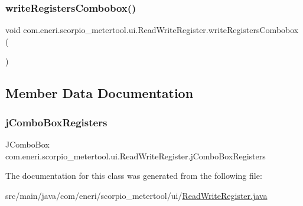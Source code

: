 \subsubsection{\texorpdfstring{write\+Registers\+Combobox()}{writeRegistersCombobox()}}
{\footnotesize\ttfamily void com.\+eneri.\+scorpio\+\_\+metertool.\+ui.\+Read\+Write\+Register.\+write\+Registers\+Combobox (\begin{DoxyParamCaption}{ }\end{DoxyParamCaption})}



\subsection{Member Data Documentation}
\mbox{\label{classcom_1_1eneri_1_1scorpio__metertool_1_1ui_1_1_read_write_register_a0dd3201c686ca00979ee14beb3a28d47}} 
\subsubsection{\texorpdfstring{j\+Combo\+Box\+Registers}{jComboBoxRegisters}}
{\footnotesize\ttfamily J\+Combo\+Box com.\+eneri.\+scorpio\+\_\+metertool.\+ui.\+Read\+Write\+Register.\+j\+Combo\+Box\+Registers}



The documentation for this class was generated from the following file\+:\begin{DoxyCompactItemize}
\item 
src/main/java/com/eneri/scorpio\+\_\+metertool/ui/\hyperlink{_read_write_register_8java}{Read\+Write\+Register.\+java}\end{DoxyCompactItemize}
